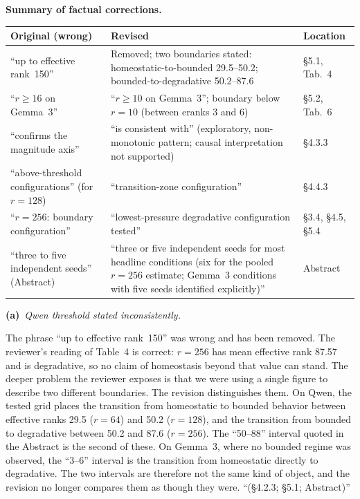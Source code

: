 \documentclass[11pt,a4paper]{article}
\newcommand{\rsub}[2]{%
  \medskip\noindent\textbf{#1}~\textit{#2}\par\smallskip%
}
\newcommand{\newtext}[1]{\textcolor{chgcolor}{``#1''}}
\begin{document}
\medskip
\noindent\textbf{Summary of factual corrections.}\par\smallskip
\renewcommand{\arraystretch}{1.1}
\begin{tabular}{@{}L{4.2cm}L{5.2cm}L{4.0cm}@{}}
\toprule
\textbf{Original (wrong)} & \textbf{Revised} & \textbf{Location} \\
\midrule
``up to effective rank~150'' & Removed; two boundaries stated:
  homeostatic-to-bounded 29.5--50.2; bounded-to-degradative 50.2--87.6
  & \S5.1, Tab.~4 \\[3pt]
``$r \geq 16$ on Gemma~3'' & ``$r \geq 10$ on Gemma~3''; boundary below $r=10$
  (between eranks 3 and 6) & \S5.2, Tab.~6 \\[3pt]
``confirms the magnitude axis'' & ``is consistent with'' (exploratory, non-monotonic
  pattern; causal interpretation not supported) & \S4.3.3 \\[3pt]
``above-threshold configurations'' (for $r=128$) & ``transition-zone configuration'' & \S4.4.3 \\[3pt]
``$r=256$: boundary configuration'' & ``lowest-pressure degradative configuration tested'' & \S3.4, \S4.5, \S5.4 \\[3pt]
``three to five independent seeds'' (Abstract) & ``three or five independent seeds for most headline conditions (six for the pooled $r{=}256$ estimate; Gemma~3 conditions with five seeds identified explicitly)'' & Abstract \\
\bottomrule
\end{tabular}
\renewcommand{\arraystretch}{1.15}
\medskip

\rsub{(a)}{Qwen threshold stated inconsistently.}
The phrase ``up to effective rank~150'' was wrong and has been removed.
The reviewer's reading of Table~4 is correct: $r=256$ has mean effective
rank 87.57 and is degradative, so no claim of homeostasis beyond that
value can stand. The deeper problem the reviewer exposes is that we were
using a single figure to describe two different boundaries. The revision
distinguishes them. On Qwen, the tested grid places the transition from
homeostatic to bounded behavior between effective ranks 29.5 ($r=64$)
and 50.2 ($r=128$), and the transition from bounded to degradative
between 50.2 and 87.6 ($r=256$). The ``50--88'' interval quoted in the
Abstract is the second of these. On Gemma~3, where no bounded regime was
observed, the ``3--6'' interval is the transition from homeostatic
directly to degradative. The two intervals are therefore not the same
kind of object, and the revision no longer compares them as though they
were.
\newtext{(\S4.2.3; \S5.1; Abstract)}
\end{document}
